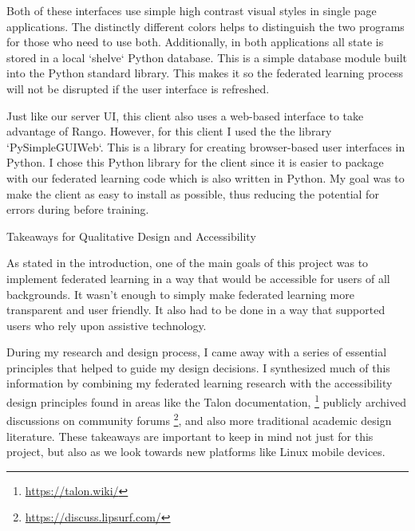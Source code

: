 \documentclass[manuscript,screen,review]{acmart}
\begin{document}
{%


Both of these interfaces use simple high contrast visual styles in single page applications. The distinctly different colors helps to distinguish the two programs for those who need to use both. Additionally, in both applications all state is stored in a local `shelve` Python database. This is a simple database module built into the Python standard library. This makes it so the federated learning process will not be disrupted if the user interface is refreshed.

Just like our server UI, this client also uses a web-based interface to take advantage of Rango. However, for this client I used the the library `PySimpleGUIWeb`. This is a library for creating browser-based user interfaces in Python. I chose this Python library for the client since it is easier to package with our federated learning code which is also written in Python. My goal was to make the client as easy to install as possible, thus reducing the potential for errors during before training.



Takeaways for Qualitative Design and Accessibility

As stated in the introduction, one of the main goals of this project was to implement federated learning in a way that would be accessible for users of all backgrounds. It wasn't enough to simply make federated learning more transparent and user friendly. It also had to be done in a way that supported users who rely upon assistive technology.

During my research and design process, I came away with a series of essential principles that helped to guide my design decisions. I synthesized much of this information by combining my federated learning research with the accessibility design principles found in areas like the Talon documentation, \footnote{\url{https://talon.wiki/}} publicly archived discussions on community forums \footnote{\url{https://discuss.lipsurf.com/}}, and also more traditional academic design literature. These takeaways are important to keep in mind not just for this project, but also as we look towards new platforms like Linux mobile devices.

}
\end{document}
